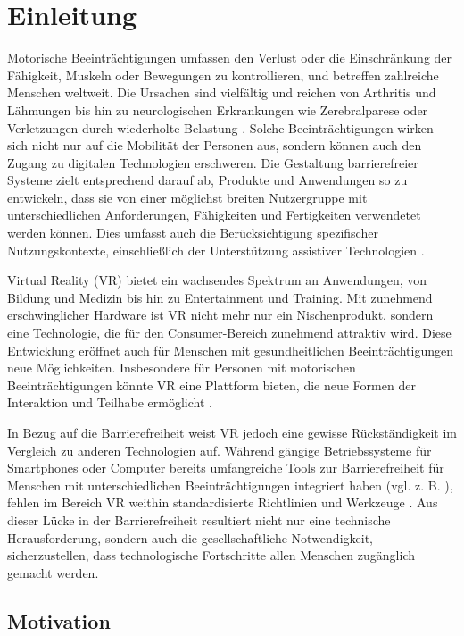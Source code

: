 \chapter{Einleitung}

Motorische Beeinträchtigungen umfassen den Verlust oder die Einschränkung der Fähigkeit, Muskeln oder Bewegungen zu kontrollieren, und betreffen zahlreiche Menschen weltweit. Die Ursachen sind vielfältig und reichen von Arthritis und Lähmungen bis hin zu neurologischen Erkrankungen wie Zerebralparese oder Verletzungen durch wiederholte Belastung \citep{yuan_game_2011}. Solche Beeinträchtigungen wirken sich nicht nur auf die Mobilität der Personen aus, sondern können auch den Zugang zu digitalen Technologien erschweren. Die Gestaltung barrierefreier Systeme zielt entsprechend darauf ab, Produkte und Anwendungen so zu entwickeln, dass sie von einer möglichst breiten Nutzergruppe mit unterschiedlichen Anforderungen, Fähigkeiten und Fertigkeiten verwendetet werden können. Dies umfasst auch die Berücksichtigung spezifischer Nutzungskontexte, einschließlich der Unterstützung assistiver Technologien \citep{DINISO9241}. 

Virtual Reality (VR) bietet ein wachsendes Spektrum an Anwendungen, von Bildung und Medizin bis hin zu Entertainment und Training. Mit zunehmend erschwinglicher Hardware ist VR nicht mehr nur ein Nischenprodukt, sondern eine Technologie, die für den Consumer-Bereich zunehmend attraktiv wird. Diese Entwicklung eröffnet auch für Menschen mit gesundheitlichen Beeinträchtigungen neue Möglichkeiten. Insbesondere für Personen mit motorischen Beeinträchtigungen könnte VR eine Plattform bieten, die neue Formen der Interaktion und Teilhabe ermöglicht \citep{10.1145/3373625.3416998}.

In Bezug auf die Barrierefreiheit weist VR jedoch eine gewisse Rückständigkeit im Vergleich zu anderen Technologien auf. Während gängige Betriebssysteme für Smartphones oder Computer bereits umfangreiche Tools zur Barrierefreiheit für Menschen mit unterschiedlichen Beeinträchtigungen integriert haben (vgl. z. B. \citep{apple_einfuhrung_2024-2}), fehlen im Bereich VR weithin standardisierte Richtlinien und Werkzeuge \citep{ciccone_next_2023}. Aus dieser Lücke in der Barrierefreiheit resultiert nicht nur eine technische Herausforderung, sondern auch die gesellschaftliche Notwendigkeit, sicherzustellen, dass technologische Fortschritte allen Menschen zugänglich gemacht werden.

\section{Motivation}

